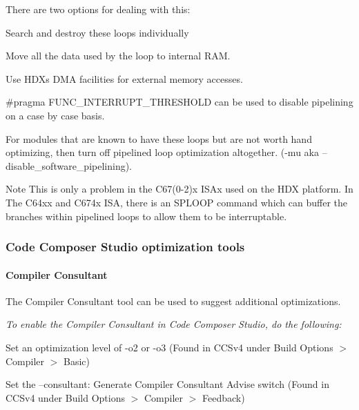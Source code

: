 There are two options for dealing with this\+: 
\begin{DoxyEnumerate}
\item Search and destroy these loops individually 
\begin{DoxyItemize}
\item Move all the data used by the loop to internal R\+AM.  
\item Use H\+DX\textquotesingle{}s D\+MA facilities for external memory accesses.  
\item {\ttfamily \#pragma F\+U\+N\+C\+\_\+\+I\+N\+T\+E\+R\+R\+U\+P\+T\+\_\+\+T\+H\+R\+E\+S\+H\+O\+LD} can be used to disable pipelining on a case by case basis.  
\end{DoxyItemize}
\item For modules that are known to have these loops but are not worth hand optimizing, then turn off pipelined loop optimization altogether. ({\ttfamily -\/mu aka –disable\+\_\+software\+\_\+pipelining}).  
\end{DoxyEnumerate}

\begin{DoxyNote}{Note}
This is only a problem in the C67(0-\/2)x I\+S\+Ax used on the H\+DX platform. In The C64xx and C674x I\+SA, there is an S\+P\+L\+O\+OP command which can buffer the branches within pipelined loops to allow them to be interruptable.
\end{DoxyNote}
\hypertarget{a00832_subsection__code_composer_studio_optimization_tools}{}\subsubsection{Code Composer Studio optimization tools}\label{a00832_subsection__code_composer_studio_optimization_tools}
 \hypertarget{a00832_subsubsection__compiler_consultant_}{}\paragraph{Compiler Consultant}\label{a00832_subsubsection__compiler_consultant_}
 The Compiler Consultant tool can be used to suggest additional optimizations.

{\itshape  To enable the Compiler Consultant in Code Composer Studio, do the following\+:} 
\begin{DoxyEnumerate}
\item Set an optimization level of {\ttfamily -\/o2} or {\ttfamily -\/o3} (Found in C\+C\+Sv4 under Build Options $>$ Compiler $>$ Basic)  
\item Set the –consultant\+: {\ttfamily Generate Compiler Consultant Advise} switch (Found in C\+C\+Sv4 under Build Options $>$ Compiler $>$ Feedback)  
\end{DoxyEnumerate}

